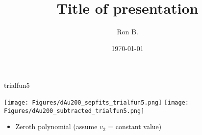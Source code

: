 \documentclass[aspectratio=169,compress,10pt]{beamer}
\title[Title of presentation]{Title of presentation}
\author[Ron B.]{Ron B.}
\institute[UNCG]{\normalsize University of North Carolina Greensboro}
\date[\today]{\today}
\begin{document}

\begin{frame}{trialfun5}
\begin{center}
\texttt{[image: Figures/dAu200\_sepfits\_trialfun5.png]}
\texttt{[image: Figures/dAu200\_subtracted\_trialfun5.png]}
\end{center}
\begin{itemize}
\item Zeroth polynomial (assume $v_2$ = constant value)
\end{itemize}
\end{frame}
\end{document}
